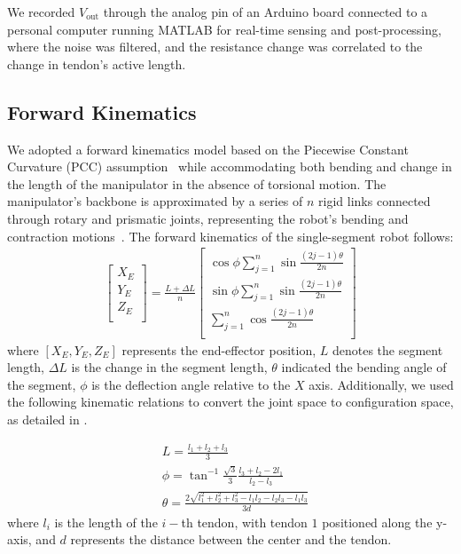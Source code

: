 \documentclass[journal, letterpaper]{IEEEtran}
\begin{document}
We recorded $V_{\text{out}}$ through the analog pin of an Arduino board connected to a personal computer running MATLAB for real-time sensing and post-processing, where the noise was filtered, and the resistance change was correlated to the change in tendon's active length.

\subsection{Forward Kinematics}

We adopted a forward kinematics model based on the Piecewise Constant Curvature (PCC) assumption~\cite{hannan2003kinematics} while accommodating both bending and change in the length of the manipulator in the absence of torsional motion.
The manipulator's backbone is approximated by a series of $n$ rigid links connected through rotary and prismatic joints, representing the robot's bending and contraction motions~\cite{keyvanara2023geometric}. The forward kinematics of the single-segment robot follows:
\begin{equation}
    \begin{aligned}
    \begin{bmatrix}
    X_{E}\\
    Y_{E}\\
    Z_{E}\\
    \end{bmatrix}  = \frac{L+\Delta L}{n}
    \begin{bmatrix} \cos\phi\sum_{j=1}^{n}\sin\frac{(2j-1)\theta}{2n}\\
    \sin\phi\sum_{j=1}^{n}\sin\frac{(2j-1)\theta}{2n}\\
    \sum_{j=1}^{n}\cos\frac{(2j-1)\theta}{2n}\\
    \end{bmatrix} 
    \end{aligned}
    \label{eq:multi_3D_ff}
\end{equation}
where $[X_E, Y_E, Z_E]$ represents the end-effector position, $L$ denotes the segment length, $\Delta L$ is the change in the segment length, $\theta$ indicated the bending angle of the segment, $\phi$ is the deflection angle relative to the $X$ axis. 
Additionally, we used the following kinematic relations to convert the joint space to configuration space, as detailed in \cite{KinematicWalker}. 

\begin{equation}
    \begin{aligned}
    & L = \frac{l_1+l_2+l_3}{3}\\
    & \phi = \tan^{-1}{\frac{\sqrt{3}}{3}\frac{l_3+l_2-2l_1}{l_2-l_3}}\\
    & \theta = \frac{2\sqrt{l_1^2+l_2^2+l_3^2-l_1l_2-l_2l_3-l_1l_3}}{3d}
    \end{aligned}
    \label{eq:joint2config}
\end{equation}
where $l_i$ is the length of the $i-$th tendon, with tendon $1$ positioned along the y-axis, and $d$ represents the distance between the center and the tendon. 
\end{document}
